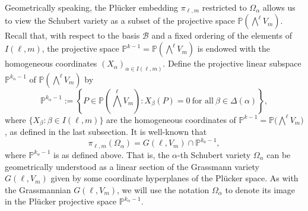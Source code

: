 \documentclass[10pt,a4paper,oneside]{amsproc}
\newcommand{\B}{\mathcal{B}}
\def\a{{\alpha}}
\def\PP{{\mathbb P}}
\begin{document}
Geometrically speaking, the Pl\"ucker embedding $\pi_{\ell, m}$ restricted to $\Omega_\a$ allows us to view the Schubert variety as a subset of the projective space $\PP\left(\bigwedge^{\ell} V_m\right)$. Recall that, with respect to the basis $\B$ and a fixed ordering of the elements of $I(\ell, m)$, the projective space $\PP^{k-1} = \PP\left(\bigwedge^{\ell} V_m\right)$ is endowed with the homogeneous coordinates $(X_{\a})_{\a \in I(\ell, m)}$. Define the projective linear subspace $\PP^{k_\a - 1}$ of $\PP\left(\bigwedge^{\ell} V_m\right)$ by 
$$\PP^{k_\a - 1} := \left\{ P \in \PP\left(\bigwedge^{\ell} V_m\right) : X_\beta (P) = 0 \ \text{for all} \ \beta \in \Delta (\a)\right\},$$
where $\{X_{\beta}: \beta \in I(\ell, m)\}$ are the homogeneous coordinates of $\PP^{k-1} = \PP \big(\bigwedge^{\ell} V_m \big)$, as defined in the last subsection.  
It is  well-known that 
\begin{equation}\label{commd1}
    \pi_{\ell, m} (\Omega_\a)  = G(\ell, V_m) \cap \PP^{k_a - 1},
\end{equation}
where $\PP^{k_\a - 1}$ is as defined above.
That is, the $\a$-th Schubert variety $\Omega_\a$ can be geometrically understood as a linear section of the Grassmann variety $G(\ell, V_m)$ given by some coordinate hyperplanes of the Pl\"ucker space. As with the Grassmannian $G(\ell, V_m)$, we will use the notation $\Omega_\a$ to denote its image in the Pl\"ucker projective space $\PP^{k_\a-1}$.  %
\end{document}

